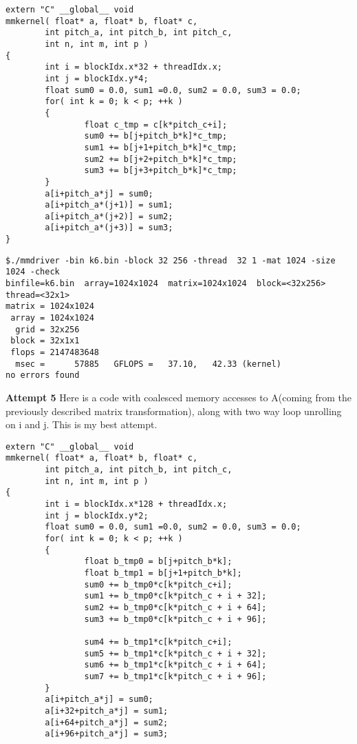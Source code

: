 \documentclass[11pt]{article}
\begin{document}
\begin{enumerate}
\begin{lstlisting}
extern "C" __global__ void
mmkernel( float* a, float* b, float* c,
        int pitch_a, int pitch_b, int pitch_c,
        int n, int m, int p )
{
        int i = blockIdx.x*32 + threadIdx.x;
        int j = blockIdx.y*4;
        float sum0 = 0.0, sum1 =0.0, sum2 = 0.0, sum3 = 0.0;
        for( int k = 0; k < p; ++k )
        {
                float c_tmp = c[k*pitch_c+i];
                sum0 += b[j+pitch_b*k]*c_tmp;
                sum1 += b[j+1+pitch_b*k]*c_tmp;
                sum2 += b[j+2+pitch_b*k]*c_tmp;
				sum3 += b[j+3+pitch_b*k]*c_tmp;
        }
        a[i+pitch_a*j] = sum0;
        a[i+pitch_a*(j+1)] = sum1;
        a[i+pitch_a*(j+2)] = sum2;
        a[i+pitch_a*(j+3)] = sum3;
}
\end{lstlisting}

\begin{lstlisting}
$./mmdriver -bin k6.bin -block 32 256 -thread  32 1 -mat 1024 -size 1024 -check
binfile=k6.bin  array=1024x1024  matrix=1024x1024  block=<32x256>  thread=<32x1>
matrix = 1024x1024
 array = 1024x1024
  grid = 32x256
 block = 32x1x1
 flops = 2147483648
  msec =      57885   GFLOPS =   37.10,   42.33 (kernel)
no errors found
\end{lstlisting}

\textbf{Attempt 5}
Here is a code with coalesced memory accesses to A(coming from the previously described matrix transformation), along with two way loop unrolling on i and j. This is my best attempt.

\begin{lstlisting}
extern "C" __global__ void
mmkernel( float* a, float* b, float* c,
        int pitch_a, int pitch_b, int pitch_c,
        int n, int m, int p )
{
        int i = blockIdx.x*128 + threadIdx.x;
        int j = blockIdx.y*2;
        float sum0 = 0.0, sum1 =0.0, sum2 = 0.0, sum3 = 0.0;
        for( int k = 0; k < p; ++k )
        {
                float b_tmp0 = b[j+pitch_b*k];
                float b_tmp1 = b[j+1+pitch_b*k];
                sum0 += b_tmp0*c[k*pitch_c+i];
                sum1 += b_tmp0*c[k*pitch_c + i + 32];
                sum2 += b_tmp0*c[k*pitch_c + i + 64];
                sum3 += b_tmp0*c[k*pitch_c + i + 96];
                
                sum4 += b_tmp1*c[k*pitch_c+i];
				sum5 += b_tmp1*c[k*pitch_c + i + 32];
                sum6 += b_tmp1*c[k*pitch_c + i + 64];
                sum7 += b_tmp1*c[k*pitch_c + i + 96];
        }
        a[i+pitch_a*j] = sum0;
        a[i+32+pitch_a*j] = sum1;
        a[i+64+pitch_a*j] = sum2;
        a[i+96+pitch_a*j] = sum3;
        

\end{lstlisting}
\end{enumerate}
\end{document}
